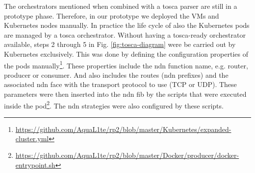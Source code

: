 \documentclass[conference]{IEEEtran}
\begin{document}
The orchestrators mentioned when combined with a \gls{tosca} parser are still in a prototype phase. Therefore, in our prototype we deployed the VMs and Kubernetes nodes manually. In practice the life cycle of also the Kubernetes pods are managed by a \gls{tosca} orchestrator. Without having a \gls{tosca}-ready orchestrator available, steps 2 through 5 in Fig. \ref{fig:tosca-diagram} were be carried out by Kubernetes exclusively. This was done by defining the configuration properties of the pods manually\footnote{\url{https://github.com/AquaL1te/rp2/blob/master/Kubernetes/expanded-cluster.yml}}. These properties include the \gls{ndn} function name, e.g. router, producer or consumer. And also includes the routes (\gls{ndn} prefixes) and the associated \gls{ndn} face with the transport protocol to use (TCP or UDP). These parameters were then inserted into the \gls{ndn} \gls{fib} by the scripts that were executed inside the pod\footnote{\url{https://github.com/AquaL1te/rp2/blob/master/Docker/producer/docker-entrypoint.sh}}. The \gls{ndn} strategies were also configured by these scripts.



\end{document}
